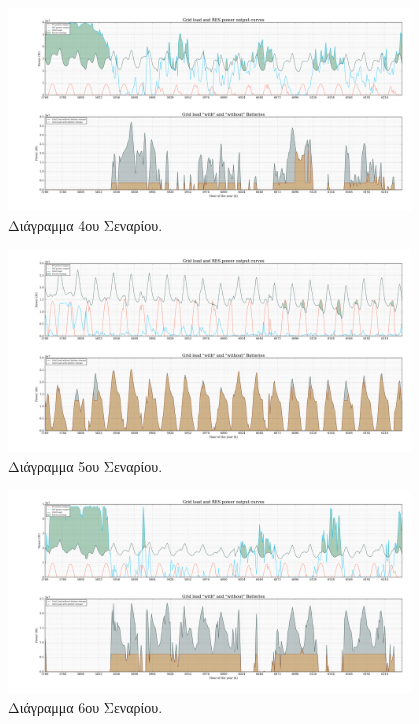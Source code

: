 \documentclass[12pt]{report}
\begin{document}
\begin{figure}
				\center
				\includegraphics[width=0.95\textwidth]{scenarios/4/plot}
				\caption{Διάγραμμα 4ου Σεναρίου.}
				\label{fig:plot4}
\end{figure}

\begin{figure}
				\center
				\includegraphics[width=0.95\textwidth]{scenarios/5/plot}
				\caption{Διάγραμμα 5ου Σεναρίου.}
				\label{fig:plot5}
\end{figure}

\begin{figure}
				\center
				\includegraphics[width=0.95\textwidth]{scenarios/6/plot}
				\caption{Διάγραμμα 6ου Σεναρίου.}
				\label{fig:plot6}
\end{figure}
\end{document}
